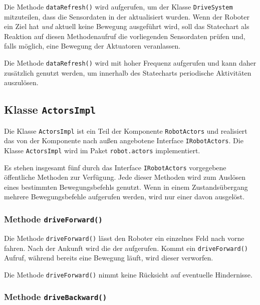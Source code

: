 Die Methode \texttt{dataRefresh()} wird aufgerufen, um der Klasse \texttt{DriveSystem} mitzuteilen, dass die Sensordaten in der  aktualisiert wurden. 
Wenn der Roboter ein Ziel hat \emph{und} aktuell keine Bewegung ausgeführt wird, soll das Statechart als Reaktion auf diesen Methodenaufruf die vorliegenden Sensordaten prüfen und, falls möglich, eine Bewegung der Aktuatoren veranlassen.

Die Methode \texttt{dataRefresh()} wird mit hoher Frequenz aufgerufen und kann daher zusätzlich genutzt werden, um innerhalb des Statecharts periodische Aktivitäten auszulösen.



\subsection{Klasse \texttt{ActorsImpl}}
\label{class:actors}

Die Klasse \texttt{ActorsImpl} ist ein Teil der Komponente \texttt{RobotActors} und realisiert das von der Komponente nach außen angebotene Interface \texttt{IRobotActors}.
Die Klasse \texttt{ActorsImpl} wird im Paket \texttt{robot.actors} implementiert.

Es stehen insgesamt fünf durch das Interface \texttt{IRobotActors} vorgegebene öffentliche Methoden zur Verfügung. 
Jede dieser Methoden wird zum Auslösen eines bestimmten Bewegungsbefehls genutzt.
Wenn in einem Zustandsübergang mehrere Bewegungsbefehle aufgerufen werden, wird nur einer davon ausgelöst.


\subsubsection{Methode \texttt{driveForward()}}
\label{method:drive}

Die Methode \texttt{driveForward()} lässt den Roboter ein einzelnes Feld nach vorne fahren. 
Nach der Ankunft wird die  der  aufgerufen.
Kommt ein \texttt{driveForward()} Aufruf, während bereits eine Bewegung läuft, wird dieser verworfen.

Die Methode \texttt{driveForward()} nimmt keine Rücksicht auf eventuelle Hindernisse.


\subsubsection{Methode \texttt{driveBackward()}}
\label{method:driveback}

